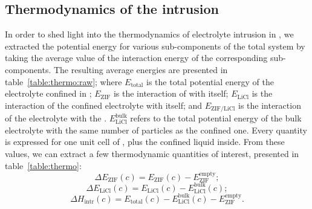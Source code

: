\documentclass[thesis]{subfiles}
\begin{document}
\subsection{Thermodynamics of the intrusion}

In order to shed light into the thermodynamics of electrolyte intrusion in
, we extracted the potential energy for various sub-components of the total
system by taking the average value of the interaction energy of the
corresponding sub-components. The resulting average energies are presented in
table~\ref{table:thermo:raw}; where $E_\text{total}$ is the total potential
energy of the electrolyte confined in ; $E_\text{ZIF}$ is the interaction
of  with itself; $E_\text{LiCl}$ is the interaction of the confined
electrolyte with itself; and $E_\text{ZIF/LiCl}$ is the interaction of the
electrolyte with the . $E_\text{LiCl}^\text{bulk}$ refers to the total
potential energy of the bulk electrolyte with the same number of particles as
the confined one. Every quantity is expressed for one unit cell of , plus
the confined liquid inside. From these values, we can extract a few
thermodynamic quantities of interest, presented in table~\ref{table:thermo}:
\[ \Delta E_\text{ZIF} (c) = E_\text{ZIF}(c) - E_\text{ZIF}^\text{empty};\]
\[ \Delta E_\text{LiCl} (c) = E_\text{LiCl}(c) - E_\text{LiCl}^\text{bulk}(c);\]
\[ \Delta H_\text{intr} (c) = E_\text{total}(c) - E_\text{LiCl}^\text{bulk}(c) - E_\text{ZIF}^\text{empty}.\]
\end{document}
